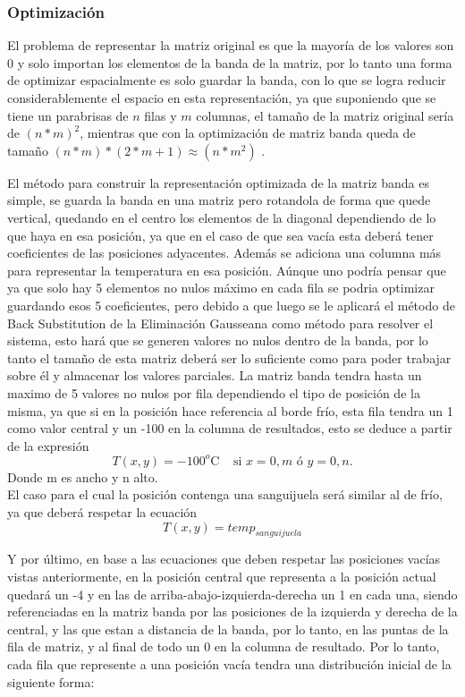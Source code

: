 \subsubsection{Optimización}

El problema de representar la matriz original es que la mayoría de los valores son 0 y solo importan los elementos de la banda de la matriz, por lo tanto una forma de optimizar espacialmente es solo guardar la banda, con lo que se logra reducir considerablemente el espacio en esta representación, ya que suponiendo que se tiene un parabrisas de $n$ filas y $m$ columnas, el tamaño de la matriz original sería de $(n*m)^2$, mientras que con la optimización de matriz banda queda de tamaño $(n*m)*(2*m+1) \approx (n*m^2)$ .

El método para construir la representación optimizada de la matriz banda es simple, se guarda la banda en una matriz pero rotandola de forma que quede vertical, quedando en el centro los elementos de la diagonal dependiendo de lo que haya en esa posición, ya que en el caso de que sea vacía esta deberá tener coeficientes de las posiciones adyacentes. Además se adiciona una columna más para representar la temperatura en esa posición.
Aúnque uno podría pensar que ya que solo hay 5 elementos no nulos máximo en cada fila se podria optimizar guardando esos 5 coeficientes, pero debido a que luego se le aplicará el método de Back Substitution de la Eliminación Gausseana como método para resolver el sistema, esto hará que se generen valores no nulos dentro de la banda, por lo tanto el tamaño de esta matriz deberá ser lo suficiente como para poder trabajar sobre él y almacenar los valores parciales.
La matriz banda tendra hasta un maximo de 5 valores no nulos por fila dependiendo el tipo de posición de la misma, ya que si en la posición hace referencia al borde frío, esta fila tendra un 1 como valor central y un -100 en la columna de resultados, esto se deduce a partir de la expresión 
\begin{equation}
T(x,y) = -100^o\textrm{C}~~~~~\textrm{si } x = 0,m \textrm{ \'o } y = 0,n. 
\label{eq:borde}
\end{equation}
Donde m es ancho y n alto.\\
 El caso para el cual la posición contenga una sanguijuela será similar al de frío, ya que deberá respetar la ecuación
 \begin{equation}
T(x,y) = temp_{sanguijuela}
\label{eq:borde}
\end{equation}

Y por último, en base a las ecuaciones que deben respetar las posiciones vacías vistas anteriormente, en la posición central que representa a la posición actual quedará un -4 y en las de arriba-abajo-izquierda-derecha un 1 en cada una, siendo referenciadas en la matriz banda por las posiciones de la izquierda y derecha de la central, y las que estan a distancia de la banda, por lo tanto, en las puntas de la fila de matriz, y al final de todo un 0 en la columna de resultado. Por lo tanto, cada fila que represente a una posición vacía tendra una distribución inicial de la siguiente forma:


